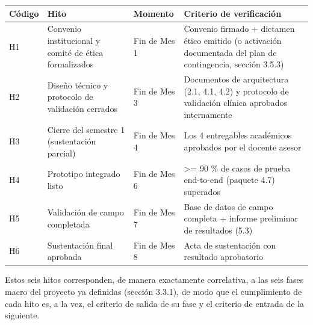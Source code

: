 \documentclass[11pt,a4paper]{article}
\begin{document}
{\small
\begin{longtable}[]{@{}
  >{\raggedright\arraybackslash}p{}
  >{\raggedright\arraybackslash}p{}
  >{\raggedright\arraybackslash}p{}
  >{\raggedright\arraybackslash}p{}@{}}
\toprule\noalign{}
\begin{minipage}[b]{\linewidth}\raggedright
Código
\end{minipage} & \begin{minipage}[b]{\linewidth}\raggedright
Hito
\end{minipage} & \begin{minipage}[b]{\linewidth}\raggedright
Momento
\end{minipage} & \begin{minipage}[b]{\linewidth}\raggedright
Criterio de verificación
\end{minipage} \\
\midrule\noalign{}
\endhead
\bottomrule\noalign{}
\endlastfoot
H1 & Convenio institucional y comité de ética formalizados & Fin de Mes 1 & Convenio firmado + dictamen ético emitido (o activación documentada del plan de contingencia, sección 3.5.3) \\
H2 & Diseño técnico y protocolo de validación cerrados & Fin de Mes 3 & Documentos de arquitectura (2.1, 4.1, 4.2) y protocolo de validación clínica aprobados internamente \\
H3 & Cierre del semestre 1 (sustentación parcial) & Fin de Mes 4 & Los 4 entregables académicos aprobados por el docente asesor \\
H4 & Prototipo integrado listo & Fin de Mes 6 & \textgreater= 90 \% de casos de prueba end-to-end (paquete 4.7) superados \\
H5 & Validación de campo completada & Fin de Mes 7 & Base de datos de campo completa + informe preliminar de resultados (5.3) \\
H6 & Sustentación final aprobada & Fin de Mes 8 & Acta de sustentación con resultado aprobatorio \\
\end{longtable}
}

Estos seis hitos corresponden, de manera exactamente correlativa, a las seis fases macro del proyecto ya definidas (sección 3.3.1), de modo que el cumplimiento de cada hito es, a la vez, el criterio de salida de su fase y el criterio de entrada de la siguiente.
\end{document}
